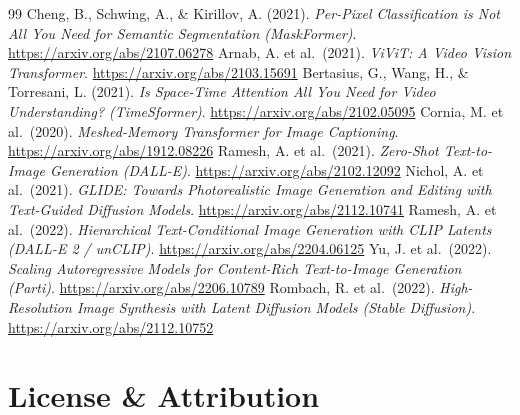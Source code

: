 \begin{vbframe}
{\begin{thebibliography}{99}
 Cheng, B., Schwing, A., \& Kirillov, A. (2021). \textit{Per-Pixel Classification is Not All You Need for Semantic Segmentation (MaskFormer)}. \url{https://arxiv.org/abs/2107.06278}
 Arnab, A. et al.\ (2021). \textit{ViViT: A Video Vision Transformer}. \url{https://arxiv.org/abs/2103.15691}
 Bertasius, G., Wang, H., \& Torresani, L. (2021). \textit{Is Space-Time Attention All You Need for Video Understanding? (TimeSformer)}. \url{https://arxiv.org/abs/2102.05095}
 Cornia, M. et al.\ (2020). \textit{Meshed-Memory Transformer for Image Captioning}. \url{https://arxiv.org/abs/1912.08226}
 Ramesh, A. et al.\ (2021). \textit{Zero-Shot Text-to-Image Generation (DALL-E)}. \url{https://arxiv.org/abs/2102.12092}
 Nichol, A. et al.\ (2021). \textit{GLIDE: Towards Photorealistic Image Generation and Editing with Text-Guided Diffusion Models}. \url{https://arxiv.org/abs/2112.10741}
 Ramesh, A. et al.\ (2022). \textit{Hierarchical Text-Conditional Image Generation with CLIP Latents (DALL-E 2 / unCLIP)}. \url{https://arxiv.org/abs/2204.06125}
 Yu, J. et al.\ (2022). \textit{Scaling Autoregressive Models for Content-Rich Text-to-Image Generation (Parti)}. \url{https://arxiv.org/abs/2206.10789}
 Rombach, R. et al.\ (2022). \textit{High-Resolution Image Synthesis with Latent Diffusion Models (Stable Diffusion)}. \url{https://arxiv.org/abs/2112.10752}
\end{thebibliography}
}
\end{vbframe}

\section{License \& Attribution}

